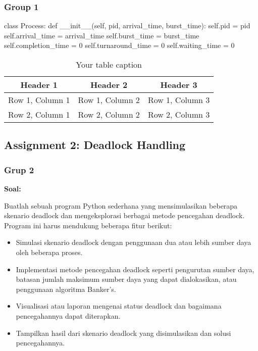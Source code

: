 \documentclass[12pt]{article}
\begin{document}
\subsubsection{Group 1}
\begin{python}
    class Process:
    def __init__(self, pid, arrival_time, burst_time):
        self.pid = pid
        self.arrival_time = arrival_time
        self.burst_time = burst_time
        self.completion_time = 0
        self.turnaround_time = 0
        self.waiting_time = 0
\end{python}

\begin{table}[htbp] %
    \centering
    \begin{tabular}{|c|c|c|} %
    \hline
    Header 1 & Header 2 & Header 3 \\ %
    \hline
    Row 1, Column 1 & Row 1, Column 2 & Row 1, Column 3 \\ %
    \hline
    Row 2, Column 1 & Row 2, Column 2 & Row 2, Column 3 \\ %
    \hline
    \end{tabular}
    \caption{Your table caption} %
    \label{tab:your_label} %
\end{table}
\subsection{Assignment 2: Deadlock Handling}
\subsubsection{Grup 2}
    \textbf{Soal:}
    \par Buatlah sebuah program Python sederhana yang mensimulasikan beberapa skenario deadlock dan mengeksplorasi berbagai metode pencegahan deadlock. Program ini harus mendukung beberapa fitur berikut:
    \begin{itemize}
    \item Simulasi skenario deadlock dengan penggunaan dua atau lebih sumber daya oleh beberapa proses.
    \item Implementasi metode pencegahan deadlock seperti pengurutan sumber daya, batasan jumlah maksimum sumber daya yang dapat dialokasikan, atau penggunaan algoritma Banker's.
    \item Visualisasi atau laporan mengenai status deadlock dan bagaimana pencegahannya dapat diterapkan.
    \item Tampilkan hasil dari skenario deadlock yang disimulasikan dan solusi pencegahannya.
    \end{itemize}
\end{document}

